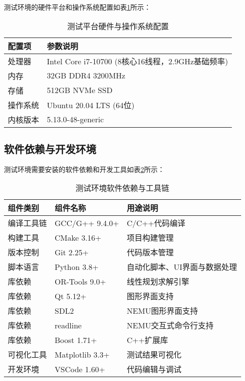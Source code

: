 \documentclass[bachelor]{thesis-uestc}
\begin{document}
测试环境的硬件平台和操作系统配置如表\ref{tab:hw_platform}所示：

\begin{table}[htbp]
\caption{测试平台硬件与操作系统配置}
\centering
\begin{tabular}{|l|l|}
\hline
\textbf{配置项} & \textbf{参数说明} \\
\hline
处理器 & Intel Core i7-10700 (8核心16线程，2.9GHz基础频率) \\
\hline
内存 & 32GB DDR4 3200MHz \\
\hline
存储 & 512GB NVMe SSD \\
\hline
操作系统 & Ubuntu 20.04 LTS (64位) \\
\hline
内核版本 & 5.13.0-48-generic \\
\hline
\end{tabular}
\label{tab:hw_platform}
\end{table}

\subsection{软件依赖与开发环境}

测试环境需要安装的软件依赖和开发工具如表\ref{tab:software_dependencies}所示：

\begin{table}[htbp]
\caption{测试环境软件依赖与工具链}
\centering
\begin{tabular}{|l|l|p{8cm}|}
\hline
\textbf{组件类别} & \textbf{组件名称} & \textbf{用途说明} \\
\hline
编译工具链 & GCC/G++ 9.4.0+ & C/C++代码编译 \\
\hline
构建工具 & CMake 3.16+ & 项目构建管理 \\
\hline
版本控制 & Git 2.25+ & 代码版本管理 \\
\hline
脚本语言 & Python 3.8+ & 自动化脚本、UI界面与数据处理 \\
\hline
库依赖 & OR-Tools 9.0+ & 线性规划求解引擎 \\
\hline
库依赖 & Qt 5.12+ & 图形界面支持 \\
\hline
库依赖 & SDL2 & NEMU图形界面支持 \\
\hline
库依赖 & readline & NEMU交互式命令行支持 \\
\hline
库依赖 & Boost 1.71+ & C++扩展库 \\
\hline
可视化工具 & Matplotlib 3.3+ & 测试结果可视化 \\
\hline
开发环境 & VSCode 1.60+ & 代码编辑与调试 \\
\hline
\end{tabular}
\label{tab:software_dependencies}
\end{table}
\end{document}
